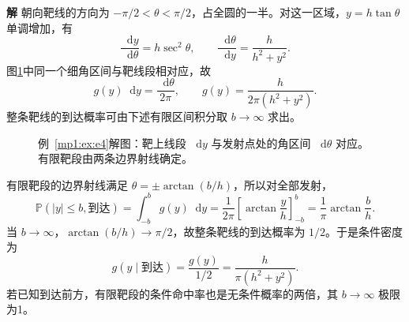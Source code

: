 \documentclass[11pt,openany,fontset=fandol]{ctexbook}
\theoremstyle{definition}\newtheorem{example}{例}[chapter]\newtheorem{exercise}{习题}[chapter]
\newcommand{\SolutionStart}{\par\medskip\ifdim\pagetotal>0pt\ifdim\dimexpr\pagegoal-\pagetotal\relax<3\baselineskip\newpage\fi\fi\noindent\textbf{解}\quad\ignorespaces}
\newenvironment{solution}{\SolutionStart}{\par\medskip}
\newcommand{\dd}{\mathop{}\!\mathrm d}\newcommand{\ee}{\mathrm e}\newcommand{\vct}[1]{\bm{#1}}
\newcommand{\Prob}{\mathbb P}\newcommand{\avg}[1]{\left\langle#1\right\rangle}
\begin{document}
\begin{solution}
朝向靶线的方向为 $-\pi/2<\theta<\pi/2$，占全圆的一半。对这一区域，$y=h\tan\theta$ 单调增加，有
\[
\frac{\dd y}{\dd\theta}=h\sec^2\theta,
\qquad \frac{\dd\theta}{\dd y}=\frac h{h^2+y^2}.
\]
图\ref{mp1:fig:e4-s}中同一个细角区间与靶线段相对应，故
\[
g(y)\dd y=\frac{\dd\theta}{2\pi},\qquad
g(y)=\frac h{2\pi(h^2+y^2)}.
\]
整条靶线的到达概率可由下述有限区间积分取 $b\to\infty$ 求出。

\begin{figure}[H]\centering

\caption{例~\ref{mp1:ex:e4}解图：靶上线段 $\dd y$ 与发射点处的角区间 $\dd\theta$ 对应。有限靶段由两条边界射线确定。}\label{mp1:fig:e4-s}
\end{figure}

有限靶段的边界射线满足 $\theta=\pm\arctan(b/h)$，所以对全部发射，
\[
\Prob(|y|\le b,\text{到达})=\int_{-b}^b g(y)\dd y
=\frac1{2\pi}\left[\arctan\frac yh\right]_{-b}^b
=\frac1\pi\arctan\frac bh.
\]
当 $b\to\infty$，$\arctan(b/h)\to\pi/2$，故整条靶线的到达概率为 $1/2$。于是条件密度为
\[
g(y\mid\text{到达})=\frac{g(y)}{1/2}
=\frac h{\pi(h^2+y^2)}.
\]
若已知到达前方，有限靶段的条件命中率也是无条件概率的两倍，其 $b\to\infty$ 极限为1。
\end{solution}
\end{document}
